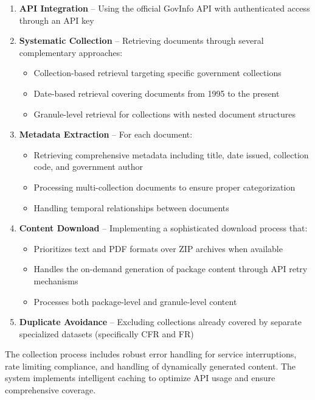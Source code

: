 \begin{enumerate}
    \item \textbf{API Integration} -- Using the official GovInfo API with authenticated access through an API key
    
    \item \textbf{Systematic Collection} -- Retrieving documents through several complementary approaches:
    \begin{itemize}
        \item Collection-based retrieval targeting specific government collections
        \item Date-based retrieval covering documents from 1995 to the present
        \item Granule-level retrieval for collections with nested document structures
    \end{itemize}
    
    \item \textbf{Metadata Extraction} -- For each document:
    \begin{itemize}
        \item Retrieving comprehensive metadata including title, date issued, collection code, and government author
        \item Processing multi-collection documents to ensure proper categorization
        \item Handling temporal relationships between documents
    \end{itemize}
    
    \item \textbf{Content Download} -- Implementing a sophisticated download process that:
    \begin{itemize}
        \item Prioritizes text and PDF formats over ZIP archives when available
        \item Handles the on-demand generation of package content through API retry mechanisms
        \item Processes both package-level and granule-level content
    \end{itemize}
    
    \item \textbf{Duplicate Avoidance} -- Excluding collections already covered by separate specialized datasets (specifically CFR and FR)
\end{enumerate}

The collection process includes robust error handling for service interruptions, rate limiting compliance, and handling of dynamically generated content. The system implements intelligent caching to optimize API usage and ensure comprehensive coverage.

